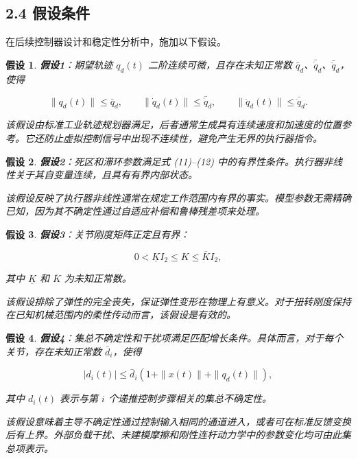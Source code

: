 \documentclass{article}
\newtheorem{assumption}{假设}
\begin{document}
\subsection{2.4 假设条件}

在后续控制器设计和稳定性分析中，施加以下假设。

\begin{assumption}
\textbf{假设1}：期望轨迹 $q_d(t)$ 二阶连续可微，且存在未知正常数 $\bar q_d$、$\bar{\dot q}_d$、$\bar{\ddot q}_d$，使得

\begin{equation}
\|q_d(t)\|\leq\bar q_d,\qquad \|\dot q_d(t)\|\leq\bar{\dot q}_d,\qquad \|\ddot q_d(t)\|\leq\bar{\ddot q}_d. \tag{16}
\end{equation}

该假设由标准工业轨迹规划器满足，后者通常生成具有连续速度和加速度的位置参考。它还防止虚拟控制信号中出现不连续性，避免产生无界的执行器指令。
\end{assumption}

\begin{assumption}
\textbf{假设2}：死区和滞环参数满足式 (11)--(12) 中的有界性条件。执行器非线性关于其自变量连续，且具有有界内部状态。

该假设反映了执行器非线性通常在规定工作范围内有界的事实。模型参数无需精确已知，因为其不确定性通过自适应补偿和鲁棒残差项来处理。
\end{assumption}

\begin{assumption}
\textbf{假设3}：关节刚度矩阵正定且有界：

\begin{equation}
0<\underline K I_2\leq K\leq\overline K I_2, \tag{17}
\end{equation}

其中 $\underline K$ 和 $\overline K$ 为未知正常数。

该假设排除了弹性的完全丧失，保证弹性变形在物理上有意义。对于扭转刚度保持在已知机械范围内的柔性传动而言，该假设是有效的。
\end{assumption}

\begin{assumption}
\textbf{假设4}：集总不确定性和干扰项满足匹配增长条件。具体而言，对于每个关节，存在未知正常数 $\bar d_i$，使得

\begin{equation}
|d_i(t)|\leq\bar d_i\left(1+\|x(t)\|+\|q_d(t)\|\right), \tag{18}
\end{equation}

其中 $d_i(t)$ 表示与第 $i$ 个递推控制步骤相关的集总不确定性。

该假设意味着主导不确定性通过控制输入相同的通道进入，或者可在标准反馈变换后有上界。外部负载干扰、未建模摩擦和刚性连杆动力学中的参数变化均可由此集总项表示。
\end{assumption}
\end{document}
